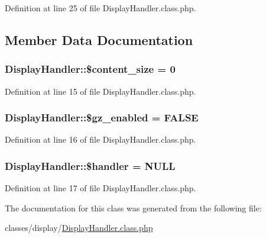 Definition at line 25 of file Display\+Handler.\+class.\+php.



\subsection{Member Data Documentation}
\hypertarget{classDisplayHandler_a16976f3c3f4d8e587c113278731a5562}{
\subsubsection[{\$content\+\_\+size}]{\setlength{\rightskip}{0pt plus 5cm}Display\+Handler\+::\$content\+\_\+size = 0}}\label{classDisplayHandler_a16976f3c3f4d8e587c113278731a5562}


Definition at line 15 of file Display\+Handler.\+class.\+php.

\hypertarget{classDisplayHandler_a15d342938e38ae003b61d9437a43d3dc}{
\subsubsection[{\$gz\+\_\+enabled}]{\setlength{\rightskip}{0pt plus 5cm}Display\+Handler\+::\$gz\+\_\+enabled = F\+A\+L\+S\+E}}\label{classDisplayHandler_a15d342938e38ae003b61d9437a43d3dc}


Definition at line 16 of file Display\+Handler.\+class.\+php.

\hypertarget{classDisplayHandler_a5bba2765a13e36d9e147424338fb2a92}{
\subsubsection[{\$handler}]{\setlength{\rightskip}{0pt plus 5cm}Display\+Handler\+::\$handler = N\+U\+L\+L}}\label{classDisplayHandler_a5bba2765a13e36d9e147424338fb2a92}


Definition at line 17 of file Display\+Handler.\+class.\+php.



The documentation for this class was generated from the following file\+:\begin{DoxyCompactItemize}
\item 
classes/display/\hyperlink{DisplayHandler_8class_8php}{Display\+Handler.\+class.\+php}\end{DoxyCompactItemize}
